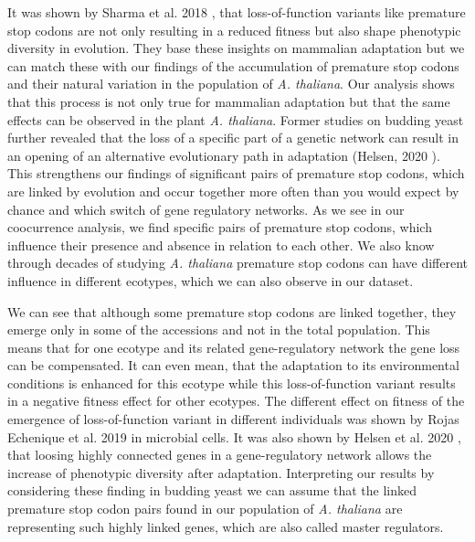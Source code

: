 It was shown by Sharma et al. 2018 \cite{Sharma2018}, that loss-of-function variants like premature stop codons are not only resulting in a reduced fitness but also shape phenotypic diversity in evolution. They base these insights on mammalian adaptation but we can match these with our findings of the accumulation of premature stop codons and their natural variation in the population of \textit{A. thaliana}. Our analysis shows that this process is not only true for mammalian adaptation but that the same effects can be observed in the plant \textit{A. thaliana}. Former studies on budding yeast further revealed that the loss of a specific part of a genetic network can result in an opening of an alternative evolutionary path in adaptation (Helsen, 2020 \cite{Helsen2020}). This strengthens our findings of significant pairs of premature stop codons, which are linked by evolution and occur together more often than you would expect by chance and which switch of gene regulatory networks. As we see in our coocurrence analysis, we find specific pairs of premature stop codons, which influence their presence and absence in relation to each other. We also know through decades of studying \textit{A. thaliana} premature stop codons can have different influence in different ecotypes, which we can also observe in our dataset. 

We can see that although some premature stop codons are linked together, they emerge only in some of the accessions and not in the total population. This means that for one ecotype and its related gene-regulatory network the gene loss can be compensated. It can even mean, that the adaptation to its environmental conditions is enhanced for this ecotype while this loss-of-function variant results in a negative fitness effect for other ecotypes. The different effect on fitness  of the emergence of loss-of-function variant in different individuals was shown by Rojas Echenique et al. 2019 \cite{Echenique2019} in microbial cells. It was also shown by Helsen et al. 2020 \cite{Helsen2020}, that loosing highly connected genes in a gene-regulatory network allows the increase of phenotypic diversity after adaptation. Interpreting our results by considering these finding in budding yeast we can assume that the linked premature stop codon pairs found in our population of \textit{A. thaliana} are representing such highly linked genes, which are also called master regulators.

